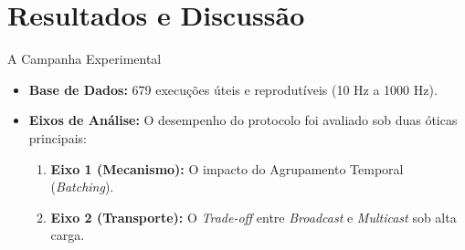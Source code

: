 \section{Resultados e Discussão}

\begin{frame}{A Campanha Experimental}
    \begin{itemize}
        \item \textbf{Base de Dados:} 679 execuções úteis e reprodutíveis (10 Hz a 1000 Hz).
        \item \textbf{Eixos de Análise:} O desempenho do protocolo foi avaliado sob duas óticas principais:
        \begin{enumerate}
            \item \textbf{Eixo 1 (Mecanismo):} O impacto do Agrupamento Temporal (\textit{Batching}).
            \item \textbf{Eixo 2 (Transporte):} O \textit{Trade-off} entre \textit{Broadcast} e \textit{Multicast} sob alta carga.
        \end{enumerate}
    \end{itemize}
\end{frame}

